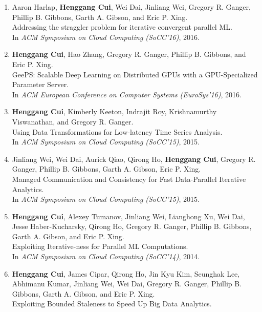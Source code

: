 \documentclass[10pt]{article}
\makeatletter
\newlength{\bibhang}
\newlength{\bibsep}
 {\@listi \global\bibsep\itemsep \global\advance\bibsep by\parsep}
\newenvironment{bibsection}%
        {\begin{enumerate}{}{%
       \setlength{\leftmargin}{\bibhang}%
       \setlength{\itemindent}{-\leftmargin}%
       \setlength{\itemsep}{\bibsep}%
       \setlength{\parsep}{\z@}%
        \setlength{\partopsep}{0pt}%
        \setlength{\topsep}{0pt}}}
        {\end{enumerate}\vspace{-.6\baselineskip}}
\makeatother
\begin{document}
\vspace{-.1275in}
\begin{bibsection}
    \item Aaron Harlap, {\bf Henggang Cui}, Wei Dai, Jinliang Wei,
        Gregory R. Ganger, Phillip B. Gibbons, Garth A. Gibson, and Eric P. Xing.\\
        Addressing the straggler problem for iterative convergent parallel ML.\\
        In \emph{ACM Symposium on Cloud Computing (SoCC'16)},
        2016.
    \item {\bf Henggang Cui}, Hao Zhang, Gregory R. Ganger, Phillip B. Gibbons, and Eric P. Xing.\\
        GeePS: Scalable Deep Learning on Distributed GPUs with a GPU-Specialized Parameter Server.\\
        In \emph{ACM European Conference on Computer Systems (EuroSys'16)},
        2016.
    \item {\bf Henggang Cui}, Kimberly Keeton, Indrajit Roy, Krishnamurthy Viswanathan, and Gregory R. Ganger.\\
        Using Data Transformations for Low-latency Time Series Analysis.\\
        In \emph{ACM Symposium on Cloud Computing (SoCC'15)},
        2015.
    \item Jinliang Wei, Wei Dai, Aurick Qiao, Qirong Ho, {\bf Henggang Cui},
        Gregory R. Ganger, Phillip B. Gibbons, Garth A. Gibson, Eric P. Xing.\\
        Managed Communication and Consistency for Fast Data-Parallel Iterative Analytics.\\
        In \emph{ACM Symposium on Cloud Computing (SoCC'15)},
        2015.
    \item {\bf Henggang Cui}, Alexey Tumanov, Jinliang Wei, Lianghong Xu, Wei Dai,
        Jesse Haber-Kucharsky, Qirong Ho, Gregory R. Ganger, Phillip B. Gibbons, Garth A. Gibson, and Eric P. Xing.\\
        Exploiting Iterative-ness for Parallel ML Computations.\\
        In \emph{ACM Symposium on Cloud Computing (SoCC'14)},
        2014.
    \item {\bf Henggang Cui}, James Cipar, Qirong Ho, Jin Kyu Kim, Seunghak Lee, Abhimanu Kumar,
        Jinliang Wei, Wei Dai, Gregory R. Ganger, Phillip B. Gibbons, Garth A. Gibson, and Eric P. Xing.\\
        Exploiting Bounded Staleness to Speed Up Big Data Analytics.\\

\end{bibsection}
\end{document}
